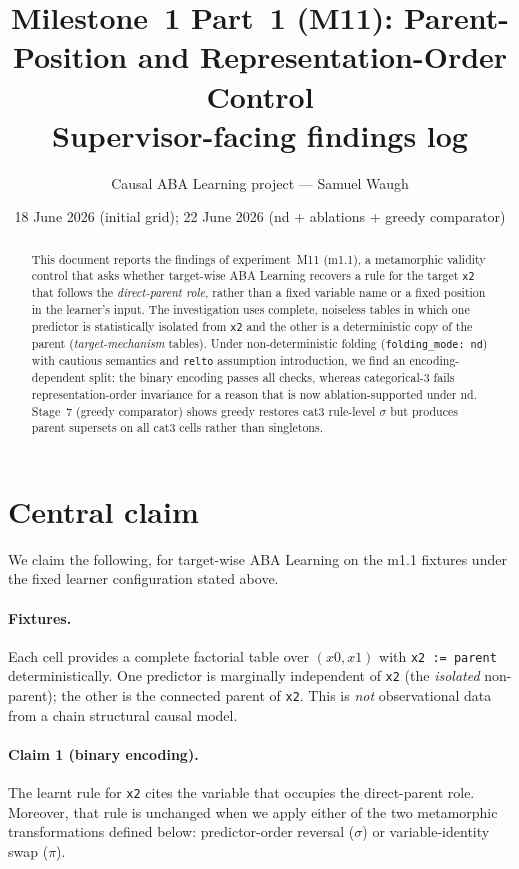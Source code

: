 \documentclass[11pt,a4paper]{article}
\title{Milestone~1 Part~1 (M11): Parent-Position and Representation-Order Control\\[0.5em]
\large Supervisor-facing findings log}
\author{Causal ABA Learning project --- Samuel Waugh}
\date{18 June 2026 \quad (initial grid); 22 June 2026 \quad (nd + ablations + greedy comparator)}
\begin{document}
\maketitle

\begin{abstract}
This document reports the findings of experiment~M11 (m1.1), a metamorphic validity control
that asks whether target-wise ABA Learning recovers a rule for the target \texttt{x2} that
follows the \emph{direct-parent role}, rather than a fixed variable name or a fixed position in
the learner's input. The investigation uses complete, noiseless tables in which one predictor is
statistically isolated from \texttt{x2} and the other is a deterministic copy of the parent
(\emph{target-mechanism} tables). Under non-deterministic folding (\texttt{folding\_mode: nd})
with cautious semantics and \texttt{relto} assumption introduction, we find an encoding-dependent
split: the binary encoding passes all checks, whereas categorical-3 fails
representation-order invariance for a reason that is now ablation-supported under nd.
Stage~7 (greedy comparator) shows greedy restores cat3 rule-level $\sigma$ but produces
parent supersets on all cat3 cells rather than singletons.
\end{abstract}

\section*{Central claim}

We claim the following, for target-wise ABA Learning on the m1.1 fixtures under the fixed
learner configuration stated above.

\paragraph{Fixtures.} Each cell provides a complete factorial table over \((x0,x1)\) with
\texttt{x2 := parent} deterministically. One predictor is marginally independent of \texttt{x2}
(the \emph{isolated} non-parent); the other is the connected parent of \texttt{x2}. This is
\emph{not} observational data from a chain structural causal model.

\paragraph{Claim 1 (binary encoding).} The learnt rule for \texttt{x2} cites the variable that
occupies the direct-parent role. Moreover, that rule is unchanged when we apply either of the two
metamorphic transformations defined below: predictor-order reversal ($\sigma$) or
variable-identity swap ($\pi$).
\end{document}
